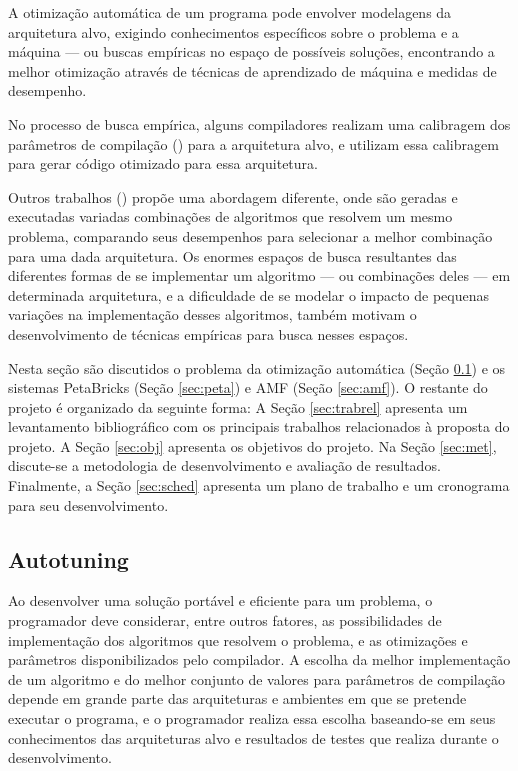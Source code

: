 \documentclass[a4paper, 11pt]{article}
\begin{document}
A otimização automática de um programa pode envolver modelagens da
arquitetura alvo, exigindo conhecimentos específicos sobre o problema e a
máquina --- ou buscas empíricas no espaço de possíveis soluções, encontrando
a melhor otimização através de técnicas de aprendizado de máquina e medidas de
desempenho.

No processo de busca empírica, alguns compiladores realizam uma calibragem dos 
parâmetros de compilação (\citet{bilmes1997,whaley1998}) para a arquitetura 
alvo, e utilizam essa calibragem para gerar código otimizado para essa 
arquitetura. 

Outros trabalhos (\citet{goldman2012framework,mitcsail-tr:2014,
vuduc2004}) propõe uma abordagem diferente, onde são geradas e executadas 
variadas combinações de algoritmos que resolvem um mesmo problema, comparando 
seus desempenhos para selecionar a melhor combinação para uma dada arquitetura.
Os enormes espaços de busca resultantes das diferentes formas de se implementar
um algoritmo --- ou combinações deles --- em determinada arquitetura, e a 
dificuldade de se modelar o impacto de pequenas variações na implementação 
desses algoritmos, também motivam o desenvolvimento de técnicas empíricas para
busca nesses espaços.

Nesta seção são discutidos o problema da otimização automática
(Seção \ref{sec:autotuning}) e os sistemas PetaBricks (Seção \ref{sec:peta}) e
AMF (Seção \ref{sec:amf}). O restante do projeto é organizado da seguinte 
forma: A Seção \ref{sec:trabrel} apresenta um levantamento bibliográfico com os
principais trabalhos relacionados à proposta do projeto.
A Seção \ref{sec:obj} apresenta os objetivos do projeto. Na Seção 
\ref{sec:met}, discute-se a metodologia de desenvolvimento e avaliação de 
resultados. Finalmente, a Seção \ref{sec:sched} apresenta um plano de trabalho
e um cronograma para seu desenvolvimento. 

\subsection{Autotuning} \label{sec:autotuning}

Ao desenvolver uma solução portável e eficiente para um problema, o
programador deve considerar, entre outros fatores, as possibilidades
de implementação dos algoritmos que resolvem o problema, e as otimizações e 
parâmetros disponibilizados pelo compilador.
A escolha da melhor implementação de um algoritmo e do melhor conjunto de 
valores para parâmetros de compilação depende em grande parte das arquiteturas 
e ambientes em que se pretende executar o programa, e o programador realiza 
essa escolha baseando-se em seus conhecimentos das arquiteturas alvo e 
resultados de testes que realiza durante o desenvolvimento.
\end{document}
